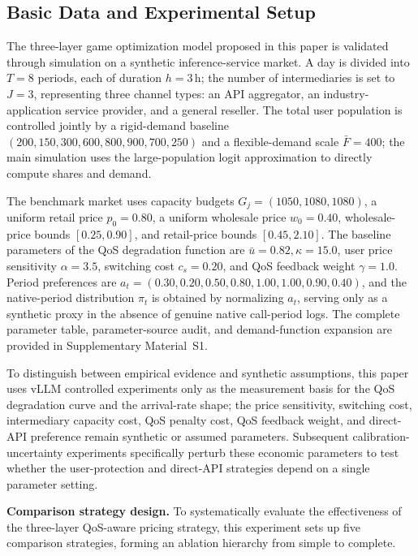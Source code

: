 \documentclass[11pt,a4paper]{article}
\begin{document}
\subsection{Basic Data and Experimental Setup}
\label{sec:basic_data}

The three-layer game optimization model proposed in this paper is validated through simulation on a synthetic inference-service market. A day is divided into $T=8$ periods, each of duration $h=3$\,h; the number of intermediaries is set to $J=3$, representing three channel types: an API aggregator, an industry-application service provider, and a general reseller. The total user population is controlled jointly by a rigid-demand baseline $(200,150,300,600,800,900,700,250)$ and a flexible-demand scale $\bar F=400$; the main simulation uses the large-population logit approximation to directly compute shares and demand.

The benchmark market uses capacity budgets $G_j=(1050,1080,1080)$, a uniform retail price $p_0=0.80$, a uniform wholesale price $w_0=0.40$, wholesale-price bounds $[0.25,0.90]$, and retail-price bounds $[0.45,2.10]$. The baseline parameters of the QoS degradation function are $\bar u=0.82,\kappa=15.0$, user price sensitivity $\alpha=3.5$, switching cost $c_s=0.20$, and QoS feedback weight $\gamma=1.0$. Period preferences are $a_t=(0.30,0.20,0.50,0.80,1.00,1.00,0.90,0.40)$, and the native-period distribution $\pi_t$ is obtained by normalizing $a_t$, serving only as a synthetic proxy in the absence of genuine native call-period logs. The complete parameter table, parameter-source audit, and demand-function expansion are provided in Supplementary Material~S1.

To distinguish between empirical evidence and synthetic assumptions, this paper uses vLLM controlled experiments only as the measurement basis for the QoS degradation curve and the arrival-rate shape; the price sensitivity, switching cost, intermediary capacity cost, QoS penalty cost, QoS feedback weight, and direct-API preference remain synthetic or assumed parameters. Subsequent calibration-uncertainty experiments specifically perturb these economic parameters to test whether the user-protection and direct-API strategies depend on a single parameter setting.

\textbf{Comparison strategy design.} To systematically evaluate the effectiveness of the three-layer QoS-aware pricing strategy, this experiment sets up five comparison strategies, forming an ablation hierarchy from simple to complete.
\end{document}
